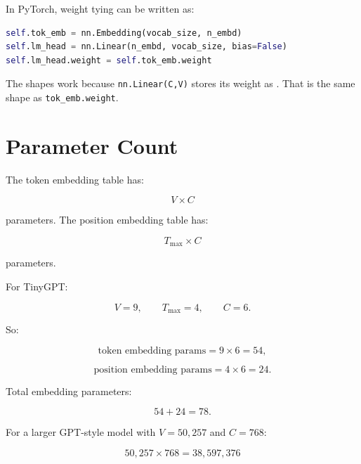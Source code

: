 In PyTorch, weight tying can be written as:

\begin{lstlisting}[language=Python]
self.tok_emb = nn.Embedding(vocab_size, n_embd)
self.lm_head = nn.Linear(n_embd, vocab_size, bias=False)
self.lm_head.weight = self.tok_emb.weight
\end{lstlisting}

The shapes work because \texttt{nn.Linear(C,V)} stores its weight as \shape{[V,C]}. That is the same shape as \texttt{tok\_emb.weight}.

\section{Parameter Count}

The token embedding table has:

\[
V\times C
\]

parameters. The position embedding table has:

\[
T_{\max}\times C
\]

parameters.

For TinyGPT:

\[
V=9,\qquad T_{\max}=4,\qquad C=6.
\]

So:

\[
\text{token embedding params}=9\times6=54,
\]

\[
\text{position embedding params}=4\times6=24.
\]

Total embedding parameters:

\[
54+24=78.
\]

\begin{center}
\end{center}

For a larger GPT-style model with \(V=50{,}257\) and \(C=768\):

\[
50{,}257\times768=38{,}597{,}376
\]

